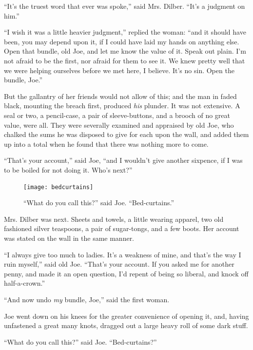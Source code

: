 \documentclass[paper=a5,BCOR=15mm,twoside,DIV=15,headinclude=off,12pt,chapterprefix=off,openany,headings=huge]{scrbook} %
\begin{document}
\enquote{It's the truest word that ever was spoke,} said Mrs. Dilber. \enquote{It's a judgment on him.}

\enquote{I wish it was a little heavier judgment,} replied the woman: \enquote{and it should have been, you may depend upon it, if I could have laid my hands on anything else. Open that bundle, old Joe, and let me know the value of it. Speak out plain. I'm not afraid to be the first, nor afraid for them to see it. We knew pretty well that we were helping ourselves before we met here, I believe. It's no sin. Open the bundle, Joe.}

But the gallantry of her friends would not allow of this; and the man in faded black, mounting the breach first, produced \textit{his} plunder. It was not extensive. A seal or two, a pencil-case, a pair of sleeve-buttons, and a brooch of no great value, were all. They were severally examined and appraised by old Joe, who chalked the sums he was disposed to give for each upon the wall, and added them up into a total when he found that there was nothing more to come.

\enquote{That's your account,} said Joe, \enquote{and I wouldn't give another sixpence, if I was to be boiled for not doing it. Who's next?}

\begin{figure}[p]
\begin{minipage}[c]{\linewidth}
\texttt{[image: bedcurtains]}
\caption*{\enquote{What do you call this?} said Joe. \enquote{Bed-curtains.}}
\end{minipage}
\end{figure}

Mrs. Dilber was next. Sheets and towels, a little wearing apparel, two old fashioned silver teaspoons, a pair of sugar-tongs, and a few boots. Her account was stated on the wall in the same manner.

\enquote{I always give too much to ladies. It's a weakness of mine, and that's the way I ruin myself,} said old Joe. \enquote{That's your account. If you asked me for another penny, and made it an open question, I'd repent of being so liberal, and knock off half-a-crown.}

\enquote{And now undo \textit{my} bundle, Joe,} said the first woman.

Joe went down on his knees for the greater convenience of opening it, and, having unfastened a great many knots, dragged out a large heavy roll of some dark stuff.

\enquote{What do you call this?} said Joe. \enquote{Bed-curtains?}
\end{document}
